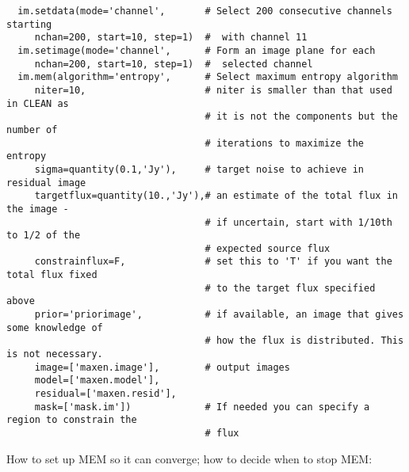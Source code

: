 \small
\begin{verbatim}
  im.setdata(mode='channel',       # Select 200 consecutive channels starting
     nchan=200, start=10, step=1)  #  with channel 11
  im.setimage(mode='channel',      # Form an image plane for each
     nchan=200, start=10, step=1)  #  selected channel
  im.mem(algorithm='entropy',      # Select maximum entropy algorithm
     niter=10,                     # niter is smaller than that used in CLEAN as
                                   # it is not the components but the number of
                                   # iterations to maximize the entropy
     sigma=quantity(0.1,'Jy'),     # target noise to achieve in residual image
     targetflux=quantity(10.,'Jy'),# an estimate of the total flux in the image -
                                   # if uncertain, start with 1/10th to 1/2 of the
                                   # expected source flux
     constrainflux=F,              # set this to 'T' if you want the total flux fixed
                                   # to the target flux specified above
     prior='priorimage',           # if available, an image that gives some knowledge of
                                   # how the flux is distributed. This is not necessary.
     image=['maxen.image'],        # output images
     model=['maxen.model'],
     residual=['maxen.resid'],
     mask=['mask.im'])             # If needed you can specify a region to constrain the
                                   # flux
\end{verbatim}
\normalsize

\vspace{3mm}

How to set up MEM so it can converge; how to decide when to stop MEM:


